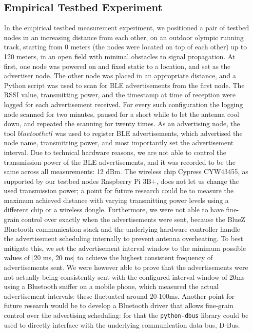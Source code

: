 \subsection{Empirical Testbed Experiment}
In the empirical testbed measurement experiment, we positioned a pair of testbed nodes in an increasing distance from each other, on an outdoor olympic running track, starting from 0 meters (the nodes were located on top of each other) up to 120 meters, in an open field with minimal obstacles to signal propagation.
At first, one node was powered on and fixed static to a location, and set as the advertiser node. The other node was placed in an appropriate distance, and a Python script was used to scan for BLE advertisements from the first node. The RSSI value, transmitting power, and the timestamp at time of reception were logged for each advertisement received. For every such configuration the logging node scanned for two minutes, paused for a short while to let the antenna cool down, and repeated the scanning for twenty times.
As an advertising node, the tool $bluetoothctl$ was used to register BLE advertisements, which advertised the node name, transmitting power, and most importantly set the advertisement interval.
Due to technical hardware reasons, we are not able to control the transmission power of the BLE advertisements, and it was recorded to be the same across all measurements: 12 dBm. The wireless chip Cypress CYW43455, as supported by our testbed nodes Raspberry Pi 3B+, does not let us change the used transmission power; a point for future research could be to measure the maximum achieved distance with varying transmitting power levels using a different chip or a wireless dongle.
Furthermore, we were not able to have fine-grain control over exactly when the advertisements were sent, because the BlueZ Bluetooth communication stack and the underlying hardware controller handle the advertisement scheduling internally to prevent antenna overheating.
To best mitigate this, we set the advertisement interval window to the minimum possible values of [20 ms, 20 ms] to achieve the highest consistent frequency of advertisements sent. We were however able to prove that the advertisements were not actually being consistently sent with the configured interval window of 20ms using a Bluetooth sniffer on a mobile phone, which measured the actual advertisement intervals: these fluctuated around 20-100ms.
Another point for future research would be to develop a Bluetooth driver that allows fine-grain control over the advertising scheduling: for that the \texttt{python-dbus} library could be used to directly interface with the underlying communication data bus, D-Bus.

